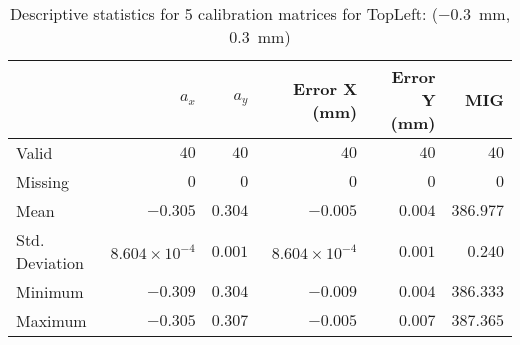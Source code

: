 \begin{table}[h]
    \vspace{10pt}

    \begin{subtable}{\textwidth}
        \centering
        \footnotesize
        \begin{tabular}{lrrrrr}
            \toprule
                & $a_x$ & $a_y$ & Error X (mm) & Error Y (mm) & MIG  \\
            \midrule
			Valid & $40$ & $40$ & $40$ & $40$ & $40$  \\
			Missing & $0$ & $0$ & $0$ & $0$ & $0$  \\
			Mean & $-0.305$ & $0.304$ & $-0.005$ & $0.004$ & $386.977$  \\
			Std. Deviation & $8.604\times10^{-4}$ & $0.001$ & $8.604\times10^{-4}$ & $0.001$ & $0.240$  \\
			Minimum & $-0.309$ & $0.304$ & $-0.009$ & $0.004$ & $386.333$  \\
			Maximum & $-0.305$ & $0.307$ & $-0.005$ & $0.007$ & $387.365$  \\
            \bottomrule
        \end{tabular}
        \caption{$T_{Avg}$}
        \label{subtable:t_avg}
        \end{subtable}

    \caption{Descriptive statistics for 5 calibration matrices for \textsf{TopLeft:} (\SI{-0.3}{\milli\meter}, \SI{0.3}{\milli\meter})}
    \label{table:stats_matrix_topleft}
\end{table}

